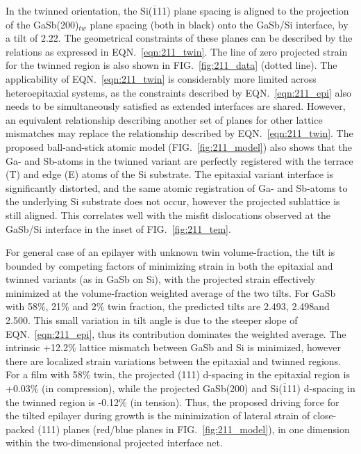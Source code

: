 In the twinned orientation, the Si($\overline{1}$11) plane spacing is aligned to the projection of the GaSb(200)$_{tw}$ plane spacing (both in black) onto the GaSb/Si interface, by a tilt of 2.22\degree. The geometrical constraints of these planes can be described by the relations as expressed in EQN.~\ref{eqn:211_twin}. The line of zero projected strain for the twinned region is also shown in FIG.~\ref{fig:211_data} (dotted line). The applicability of EQN.~\ref{eqn:211_twin} is considerably more limited across heteroepitaxial systems, as the constraints described by EQN.~\ref{eqn:211_epi} also needs to be simultaneously satisfied as extended interfaces are shared. However, an equivalent relationship describing another set of planes for other lattice mismatches may replace the relationship described by EQN.~\ref{eqn:211_twin}. The proposed ball-and-stick atomic model (FIG.~\ref{fig:211_model}) also shows that the Ga- and Sb-atoms in the twinned variant are perfectly registered with the terrace (T) and edge (E) atoms of the Si substrate. The epitaxial variant interface is significantly distorted, and the same atomic registration of Ga- and Sb-atoms to the underlying Si substrate does not occur, however the projected sublattice is still aligned. This correlates well with the misfit dislocations observed at the GaSb/Si interface in the inset of FIG.~\ref{fig:211_tem}.

For general case of an epilayer with unknown twin volume-fraction, the tilt is bounded by competing factors of minimizing strain in both the epitaxial and twinned variants (as in GaSb on Si), with the projected strain effectively minimized at the volume-fraction weighted average of the two tilts. For GaSb with 58\%, 21\% and 2\% twin fraction, the predicted tilts are 2.493\degree, 2.498\degree and 2.500\degree. This small variation in tilt angle is due to the steeper slope of EQN.~\ref{eqn:211_epi}, thus its contribution dominates the weighted average. The intrinsic +12.2\% lattice mismatch between GaSb and Si is minimized, however there are localized strain variations between the epitaxial and twinned regions. For a film with 58\% twin, the projected (111) d-spacing in the epitaxial region is +0.03\% (in compression), while the projected GaSb(200) and Si($\overline{1}$11) d-spacing in the twinned region is -0.12\% (in tension). Thus, the proposed driving force for the tilted epilayer during growth is the minimization of lateral strain of close-packed (111) planes (red/blue planes in FIG.~\ref{fig:211_model}), in one dimension within the two-dimensional projected interface net.

